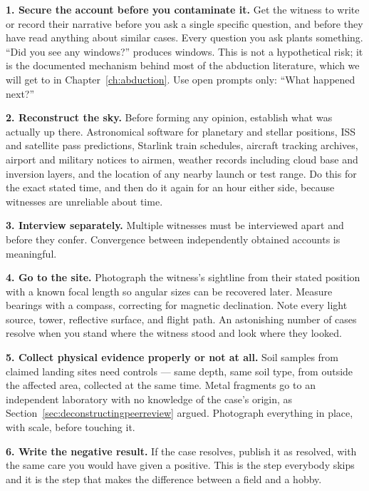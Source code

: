 \textbf{1. Secure the account before you contaminate it.} Get the witness to write or
record their narrative before you ask a single specific question, and before they have read
anything about similar cases. Every question you ask plants something. ``Did you see any
windows?'' produces windows. This is not a hypothetical risk; it is the documented
mechanism behind most of the abduction literature, which we will get to in
Chapter~\ref{ch:abduction}. Use open prompts only: ``What happened next?''

\textbf{2. Reconstruct the sky.} Before forming any opinion, establish what was actually
up there. Astronomical software for planetary and stellar positions, ISS and satellite pass
predictions, Starlink train schedules, aircraft tracking archives, airport and military
notices to airmen, weather records including cloud base and inversion layers, and the
location of any nearby launch or test range. Do this for the exact stated time, and then do
it again for an hour either side, because witnesses are unreliable about time.

\textbf{3. Interview separately.} Multiple witnesses must be interviewed apart and before
they confer. Convergence between independently obtained accounts is meaningful. 

\textbf{4. Go to the site.} Photograph the witness's sightline from their stated position
with a known focal length so angular sizes can be recovered later. Measure bearings with a
compass, correcting for magnetic declination. Note every light source, tower, reflective
surface, and flight path. An astonishing number of cases resolve when you stand where the
witness stood and look where they looked.

\textbf{5. Collect physical evidence properly or not at all.} Soil samples from claimed
landing sites need controls --- same depth, same soil type, from outside the affected area,
collected at the same time. 
Metal fragments go to an independent laboratory with no knowledge of the case's origin, as
Section~\ref{sec:deconstructingpeerreview} argued. Photograph everything in place, with scale, before touching it.

\textbf{6. Write the negative result.} If the case resolves, publish it as resolved, with
the same care you would have given a positive. This is the step everybody skips and it is
the step that makes the difference between a field and a hobby.


